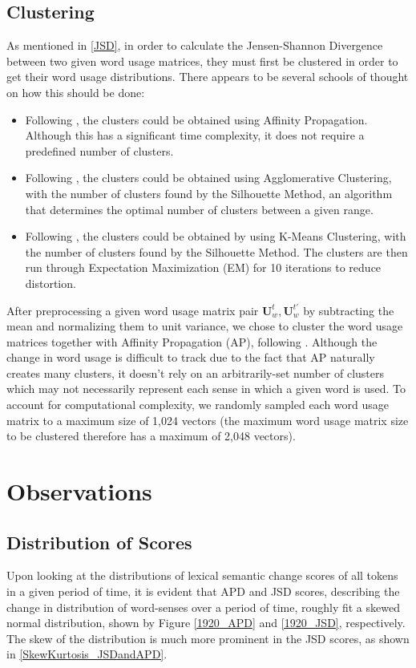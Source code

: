 \documentclass[10pt, a4paper]{article}
\begin{document}
\subsection{Clustering}
\label{clustering}
As mentioned in \ref{JSD}, in order to calculate the Jensen-Shannon Divergence between two given word usage matrices, they must first be clustered in order to get their word usage distributions. There appears to be several schools of thought on how this should be done:
\begin{itemize}
    \item{Following \cite{Martinc2020,Kutuzov2020}, the clusters could be obtained using Affinity Propagation. Although this has a significant time complexity, it does not require a predefined number of clusters.}
    \item{Following \cite{Laicher2021}, the clusters could be obtained using Agglomerative Clustering, with the number of clusters found by the Silhouette Method\cite{silhouette}, an algorithm that determines the optimal number of clusters between a given range.}
    \item{Following \cite{Giulianelli2020}, the clusters could be obtained by using K-Means Clustering, with the number of clusters found by the Silhouette Method. The clusters are then run through Expectation Maximization (EM) for 10 iterations to reduce distortion.}
\end{itemize}

After preprocessing a given word usage matrix pair $\textbf{U}^{t}_w, \textbf{U}^{t'}_w$ by subtracting the mean and normalizing them to unit variance, we chose to cluster the word usage matrices together with Affinity Propagation (AP), following \cite{Martinc2020,Kutuzov2020}. Although the change in word usage is difficult to track due to the fact that AP naturally creates many clusters, it doesn't rely on an arbitrarily-set number of clusters which may not necessarily represent each sense in which a given word is used. To account for computational complexity, we randomly sampled each word usage matrix to a maximum size of 1,024 vectors (the maximum word usage matrix size to be clustered therefore has a maximum of 2,048 vectors).

\section{Observations}
\subsection{Distribution of Scores}
Upon looking at the distributions of lexical semantic change scores of all tokens in a given period of time, it is evident that APD and JSD scores, describing the change in distribution of word-senses over a period of time, roughly fit a skewed normal distribution, shown by Figure \ref{1920_APD} and \ref{1920_JSD}, respectively. The skew of the distribution is much more prominent in the JSD scores, as shown in \ref{SkewKurtosis_JSDandAPD}. 
\end{document}
